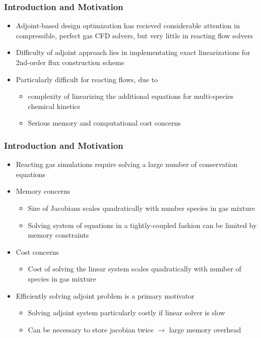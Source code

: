 \documentclass{beamer}
\begin{document}
\begin{frame}
  \frametitle{Introduction and Motivation}
  \begin{itemize}
    \item Adjoint-based design optimization has recieved considerable attention
      in compressible, perfect gas CFD solvers, but very little in reacting flow
      solvers
    \item Difficulty of adjoint approach lies in implementating exact
      linearizations for 2nd-order flux construction scheme
    \item Particularly difficult for reacting flows, due to 
      \begin{itemize}
        \item complexity of linearizing the additional equations for
          multi-species chemical kinetics
        \item Serious memory and computational cost concerns
      \end{itemize}
  \end{itemize}
\end{frame}
\begin{frame}
  \frametitle{Introduction and Motivation}
  \begin{itemize}
    \item Reacting gas simulations require solving a large number of conservation
      equations
    \item Memory concerns
    \begin{itemize}
        \item Size of Jacobians scales quadratically with number species in gas mixture
        \item Solving system of equations in a tightly-coupled fashion can be
          limited by memory constraints
    \end{itemize}
    \item Cost concerns
    \begin{itemize}
      \item Cost of solving the linear system scales quadratically with number
      of species in gas mixture
    \end{itemize}
    \item Efficiently solving adjoint problem is a primary motivator
      \begin{itemize}
        \item Solving adjoint system particularly costly if linear solver is
          slow
        \item Can be necessary to store jacobian twice $\to$ large memory
          overhead
      \end{itemize}
  \end{itemize}
\end{frame}
\end{document}

